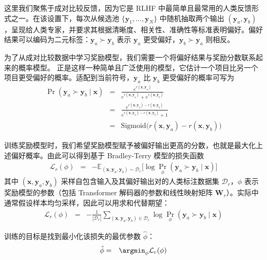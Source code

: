 这里我们聚焦于成对比较反馈，因为它是 RLHF 中最简单且最常用的人类反馈形式之一。在该设置下，每次从候选池 $\{\mathbf{y}_1,\dots,\mathbf{y}_N\}$ 中随机抽取两个输出 $(\mathbf{y}_a,\mathbf{y}_b)$，呈现给人类专家，并要求其根据清晰度、相关性、准确性等标准表明偏好。偏好结果可以编码为二元标签：$\mathbf{y}_a \succ \mathbf{y}_b$ 表示 $\mathbf{y}_a$ 更受偏好，$\mathbf{y}_b \succ \mathbf{y}_a$ 则相反。

为了从成对比较数据中学习奖励模型，我们需要一个将偏好结果与奖励分数联系起来的概率模型。 \cite{bradley-and-terry:rank} 正是这样一种简单且广泛使用的模型，它估计一个项目比另一个项目更受偏好的概率。适配到当前符号，$\mathbf{y}_a$ 比 $\mathbf{y}_b$ 更受偏好的概率可写为
\begin{eqnarray}
\Pr(\mathbf{y}_a \succ \mathbf{y}_b \mid \mathbf{x}) & = & \frac{e^{r(\mathbf{x},\mathbf{y}_a)}}{e^{r(\mathbf{x},\mathbf{y}_a)} + e^{r(\mathbf{x},\mathbf{y}_b)}} \nonumber \\
                                                  & = & \frac{e^{r(\mathbf{x},\mathbf{y}_a)-r(\mathbf{x},\mathbf{y}_b)}}{e^{r(\mathbf{x},\mathbf{y}_a)-r(\mathbf{x},\mathbf{y}_b)}+1} \nonumber \\
                                                  & = & \mathrm{Sigmoid}\bigl(r(\mathbf{x},\mathbf{y}_a)-r(\mathbf{x},\mathbf{y}_b)\bigr)
\end{eqnarray}

训练奖励模型时，我们希望奖励模型赋予被偏好输出更高的分数，也就是最大化上述偏好概率。由此可以得到基于 Bradley-Terry 模型的损失函数
\begin{eqnarray}
\mathcal{L}_r(\phi) & = & -\mathbb{E}_{(\mathbf{x},\mathbf{y}_a,\mathbf{y}_b) \sim \mathcal{D}_r} \bigl[ \log \Pr_{\phi}(\mathbf{y}_a \succ \mathbf{y}_b \mid \mathbf{x}) \bigr] \label{eq:pairwise-reward-loss-expectation}
\end{eqnarray}
其中 $(\mathbf{x},\mathbf{y}_a,\mathbf{y}_b)$ 采样自包含输入及其偏好输出对的人类标注数据集 $\mathcal{D}_r$，$\phi$ 表示奖励模型的参数（包括 Transformer 解码器的参数和线性映射矩阵 $\mathbf{W}_{r}$）。实际中通常假设样本均匀采样，因此可以用求和代替期望：
\begin{eqnarray}
\mathcal{L}_r(\phi) & = & -\frac{1}{|\mathcal{D}_r|} \sum_{(\mathbf{x},\mathbf{y}_a,\mathbf{y}_b) \in \mathcal{D}_r} \log \Pr_{\phi}(\mathbf{y}_a \succ \mathbf{y}_b \mid \mathbf{x}) \label{eq:pairwise-reward-loss-sum}
\end{eqnarray}

训练的目标是找到最小化该损失的最优参数 $\hat{\phi}$：
\begin{eqnarray}
\hat{\phi} & = & \argmin_{\phi} \mathcal{L}_r(\phi)
\end{eqnarray}

